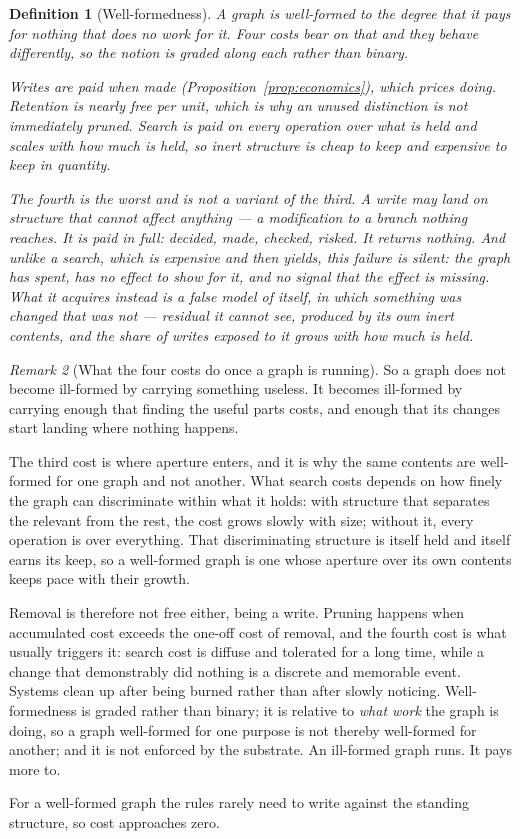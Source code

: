 \documentclass[11pt,a4paper]{article}
\newtheorem{definition}{Definition}[section]
\theoremstyle{remark}\newtheorem{remark}[definition]{Remark}
\begin{document}
\begin{definition}[Well-formedness]\label{def:well-formed}
A graph is \emph{well-formed} to the degree that it pays for nothing that does no work for it. Four costs bear on that and they behave differently, so the notion is graded along each rather than binary.

\emph{Writes} are paid when made (Proposition~\ref{prop:economics}), which prices doing. \emph{Retention} is nearly free per unit, which is why an unused distinction is not immediately pruned. \emph{Search} is paid on every operation over what is held and scales with how much is held, so inert structure is cheap to keep and expensive to keep in quantity.

The fourth is the worst and is not a variant of the third. A write may land on structure that cannot affect anything --- a modification to a branch nothing reaches. It is paid in full: decided, made, checked, risked. It returns nothing. And unlike a search, which is expensive and then yields, this failure is \emph{silent}: the graph has spent, has no effect to show for it, and no signal that the effect is missing. What it acquires instead is a false model of itself, in which something was changed that was not --- residual it cannot see, produced by its own inert contents, and the share of writes exposed to it grows with how much is held.
\end{definition}

\begin{remark}[What the four costs do once a graph is running]\label{rem:well-formed-dynamics}
So a graph does not become ill-formed by carrying something useless. It becomes ill-formed by carrying enough that finding the useful parts costs, and enough that its changes start landing where nothing happens.

The third cost is where aperture enters, and it is why the same contents are well-formed for one graph and not another. What search costs depends on how finely the graph can discriminate within what it holds: with structure that separates the relevant from the rest, the cost grows slowly with size; without it, every operation is over everything. That discriminating structure is itself held and itself earns its keep, so a well-formed graph is one whose aperture over its own contents keeps pace with their growth.

Removal is therefore not free either, being a write. Pruning happens when accumulated cost exceeds the one-off cost of removal, and the fourth cost is what usually triggers it: search cost is diffuse and tolerated for a long time, while a change that demonstrably did nothing is a discrete and memorable event. Systems clean up after being burned rather than after slowly noticing. Well-formedness is graded rather than binary; it is relative to \emph{what work} the graph is doing, so a graph well-formed for one purpose is not thereby well-formed for another; and it is not enforced by the substrate. An ill-formed graph runs. It pays more to.
\end{remark}
For a well-formed graph the rules rarely need to write against the standing structure, so cost approaches zero.
\end{document}
